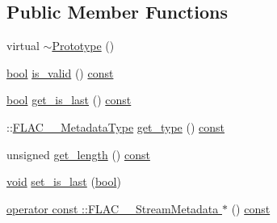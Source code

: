 \subsection*{Public Member Functions}
\begin{DoxyCompactItemize}
\item 
virtual \hyperlink{class_f_l_a_c_1_1_metadata_1_1_prototype_a35ae903d2bcb0933eec698d3d71fcee5}{$\sim$\+Prototype} ()
\item 
\hyperlink{mac_2config_2i386_2lib-src_2libsoxr_2soxr-config_8h_abb452686968e48b67397da5f97445f5b}{bool} \hyperlink{group__flacpp__metadata__object_ga57adba3b3a548f7d9d8803762a8216d6}{is\+\_\+valid} () \hyperlink{getopt1_8c_a2c212835823e3c54a8ab6d95c652660e}{const} 
\item 
\hyperlink{mac_2config_2i386_2lib-src_2libsoxr_2soxr-config_8h_abb452686968e48b67397da5f97445f5b}{bool} \hyperlink{class_f_l_a_c_1_1_metadata_1_1_prototype_ae9e4332c5d2b66ca39763b371420e166}{get\+\_\+is\+\_\+last} () \hyperlink{getopt1_8c_a2c212835823e3c54a8ab6d95c652660e}{const} 
\item 
\+::\hyperlink{group__flac__format_gac71714ba8ddbbd66d26bb78a427fac01}{F\+L\+A\+C\+\_\+\+\_\+\+Metadata\+Type} \hyperlink{class_f_l_a_c_1_1_metadata_1_1_prototype_abbbd09554ee2abaf2041e0617d616828}{get\+\_\+type} () \hyperlink{getopt1_8c_a2c212835823e3c54a8ab6d95c652660e}{const} 
\item 
unsigned \hyperlink{class_f_l_a_c_1_1_metadata_1_1_prototype_a5fd592fd29018c66d29f0940f3cf05b3}{get\+\_\+length} () \hyperlink{getopt1_8c_a2c212835823e3c54a8ab6d95c652660e}{const} 
\item 
\hyperlink{sound_8c_ae35f5844602719cf66324f4de2a658b3}{void} \hyperlink{class_f_l_a_c_1_1_metadata_1_1_prototype_af40c7c078e408f7d6d0b5f521a013315}{set\+\_\+is\+\_\+last} (\hyperlink{mac_2config_2i386_2lib-src_2libsoxr_2soxr-config_8h_abb452686968e48b67397da5f97445f5b}{bool})
\item 
\hyperlink{group__flacpp__metadata__object_gadad62834e7055e4996f3f6791553a214}{operator const \+::\+F\+L\+A\+C\+\_\+\+\_\+\+Stream\+Metadata $\ast$} () \hyperlink{getopt1_8c_a2c212835823e3c54a8ab6d95c652660e}{const} 
\end{DoxyCompactItemize}
{\bf }\par
